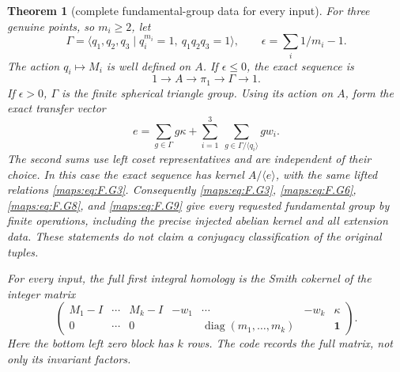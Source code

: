 \documentclass[11pt,a4paper]{article}
\newtheorem{theorem}{Theorem}[section]
\theoremstyle{definition}
\begin{document}
\begin{theorem}[complete fundamental-group data for every input]
For three genuine points, so $m_i\ge2$, let
\[
 \Gamma=\langle q_1,q_2,q_3\mid q_i^{m_i}=1,
                         \ q_1q_2q_3=1\rangle,
 \qquad \epsilon=\sum_i1/m_i-1.                           \tag{F.G7}\label{maps:eq:F.G7}
\]
The action $q_i\mapsto M_i$ is well defined on $A$.
If $\epsilon\le0$, the exact sequence is
\[
                    1\longrightarrow A\longrightarrow\pi_1
                         \longrightarrow\Gamma\longrightarrow1. 
 \tag{F.G8}\label{maps:eq:F.G8}
\]
If $\epsilon>0$, $\Gamma$ is the finite spherical triangle group.
Using its action on $A$, form the exact transfer vector
\[
 e=\sum_{g\in\Gamma}g\kappa+
       \sum_{i=1}^3\ \sum_{g\in\Gamma/\langle q_i\rangle}g w_i.
 \tag{F.G9}\label{maps:eq:F.G9}
\]
The second sums use left coset representatives and are independent
of their choice.  In this case the exact sequence has kernel
$A/\langle e\rangle$, with the same lifted relations \eqref{maps:eq:F.G3}.
Consequently \eqref{maps:eq:F.G3}, \eqref{maps:eq:F.G6}, \eqref{maps:eq:F.G8}, and \eqref{maps:eq:F.G9} give every requested
fundamental group by finite operations, including the precise
injected abelian kernel and all extension data.  These statements
do not claim a conjugacy classification of the original tuples.

For every input, the full first integral homology is the Smith
cokernel of the integer matrix
\[
 \begin{pmatrix}
 M_1-I&\cdots&M_k-I&-w_1&\cdots&-w_k&\kappa\\
 0&\cdots&0&&\operatorname{diag}(m_1,\ldots,m_k)&&\boldsymbol1
 \end{pmatrix}.                                           \tag{F.G10}\label{maps:eq:F.G10}
\]
Here the bottom left zero block has $k$ rows.  The code records
the full matrix, not only its invariant factors.

\end{theorem}
\end{document}
